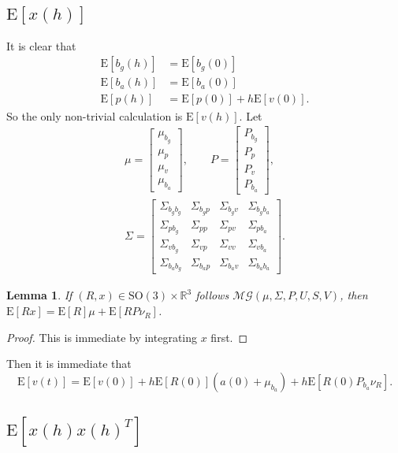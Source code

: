 \documentclass[10pt]{article}
\newtheorem{lemma}{Lemma}
\newcommand{\expect}[1]{\ensuremath{\mathrm{E}\left[ #1 \right]}}
\newcommand{\SO}{\ensuremath{\mathrm{SO(3)}}}
\newcommand{\real}[1]{\ensuremath{\mathbb{R}^{ #1 }}}
\begin{document}
\subsection{$\expect{x(h)}$}
It is clear that
\begin{align*}
	\expect{b_g(h)} &= \expect{b_g(0)} \\
	\expect{b_a(h)} &= \expect{b_a(0)} \\
	\expect{p(h)} &= \expect{p(0)}+h\expect{v(0)}.
\end{align*}
So the only non-trivial calculation is $\expect{v(h)}$.
Let
\begin{gather*}
	\mu = \begin{bmatrix}
		\mu_{b_g} \\ \mu_p \\ \mu_v \\ \mu_{b_a}
	\end{bmatrix}, \qquad
	P = \begin{bmatrix}
		P_{b_g} \\ P_p \\ P_v \\ P_{b_a}
	\end{bmatrix}, \\
	\Sigma = \begin{bmatrix}
		\Sigma_{b_gb_g} & \Sigma_{b_gp} & \Sigma_{b_gv} & \Sigma_{b_gb_a} \\
		\Sigma_{pb_g} & \Sigma_{pp} & \Sigma_{pv} & \Sigma_{pb_a} \\
		\Sigma_{vb_g} & \Sigma_{vp} & \Sigma_{vv} & \Sigma_{vb_a} \\
		\Sigma_{b_ab_g} & \Sigma_{b_ap} & \Sigma_{b_av} & \Sigma_{b_ab_a}
	\end{bmatrix}.
\end{gather*}

\begin{lemma}
	If $(R,x)\in\SO\times\real{3}$ follows $\mathcal{MG}(\mu,\Sigma,P,U,S,V)$, then $\expect{Rx} = \expect{R}\mu + \expect{RP\nu_R}$.
\end{lemma}
\begin{proof}
	This is immediate by integrating $x$ first.
\end{proof}

Then it is immediate that
\begin{equation}
	\expect{v(t)} = \expect{v(0)} + h\expect{R(0)}(a(0)+\mu_{b_a}) + h\expect{R(0)P_{b_a}\nu_R}.
\end{equation}

\subsection{$\expect{x(h)x(h)^T}$}
\end{document}
